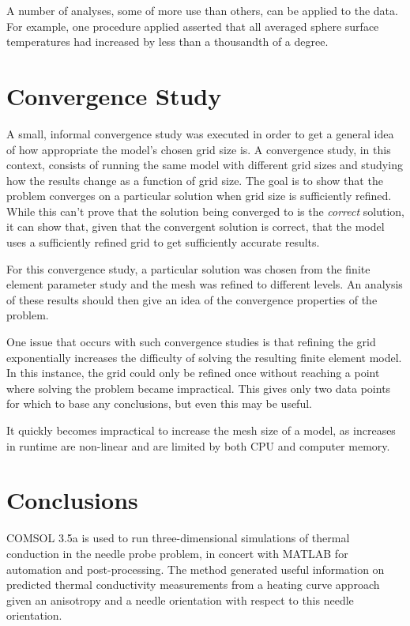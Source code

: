 A number of analyses, some of more use than others, can be applied to the
data. For example, one procedure applied asserted that all averaged sphere
surface temperatures had increased by less than a thousandth of a degree.

\section{Convergence Study}

A small, informal convergence study was executed in order to get a general idea
of how appropriate the model's chosen grid size is. A convergence study, in this
context, consists of running the same model with different grid sizes and
studying how the results change as a function of grid size.  The goal is to show
that the problem converges on a particular solution when grid size is
sufficiently refined. While this can't prove that the solution being converged
to is the \emph{correct} solution, it can show that, given that the convergent
solution is correct, that the model uses a sufficiently refined grid to get
sufficiently accurate results.

For this convergence study, a particular solution was chosen from the finite
element parameter study and the mesh was refined to different levels. An
analysis of these results should then give an idea of the convergence properties
of the problem.

One issue that occurs with such convergence studies is that refining the grid
exponentially increases the difficulty of solving the resulting finite element
model. In this instance, the grid could only be refined once without reaching
a point where solving the problem became impractical. This gives only two data
points for which to base any conclusions, but even this may be useful.

\begin{table}[h]
\centering

\caption{It quickly becomes impractical to increase the mesh size of a model, as
increases in runtime are non-linear and are limited by both CPU and computer memory.}
\label{tab:conv_runtime}
\end{table}

\section{Conclusions}

COMSOL 3.5a is used to run three-dimensional simulations of thermal conduction
in the needle probe problem, in concert with MATLAB for automation and
post-processing. The method generated
useful information on predicted thermal conductivity measurements from a heating
curve approach given an anisotropy and a needle orientation with respect to this
needle orientation.
